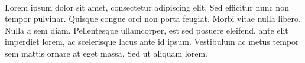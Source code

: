 \paragraph{}  Lorem ipsum dolor sit amet, consectetur adipiscing elit. Sed efficitur nunc non tempor pulvinar. Quisque congue orci non porta feugiat. Morbi vitae nulla libero. Nulla a sem diam. Pellentesque ullamcorper, est sed posuere eleifend, ante elit imperdiet lorem, ac scelerisque lacus ante id ipsum. Vestibulum ac metus tempor sem mattis ornare at eget massa. Sed ut aliquam lorem. 